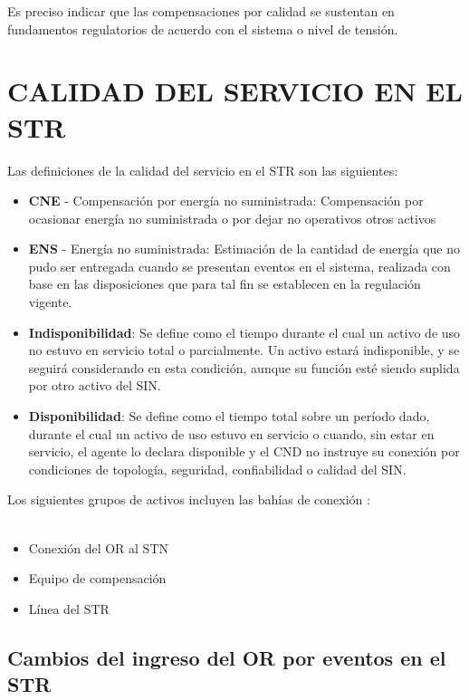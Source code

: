 \documentclass[a5paper]{book}%
\begin{document}
Es preciso indicar que las compensaciones por calidad se sustentan en fundamentos regulatorios
de acuerdo con el sistema o nivel de tensión.


\section{CALIDAD DEL SERVICIO EN EL STR}

Las definiciones de la calidad del servicio en el \ac{STR} son las siguientes:

\begin{itemize}
\item  \textbf{CNE} - Compensación por energía no suministrada: Compensación por ocasionar energía no suministrada o por dejar no operativos otros activos
\item \textbf{ENS} - Energía no suministrada: Estimación de la cantidad de energía que no pudo ser entregada cuando se presentan eventos en el sistema, realizada con base en las disposiciones que para tal fin se establecen en la regulación vigente.
\item \textbf{Indisponibilidad}: Se define como el tiempo durante el cual un activo de uso no estuvo en servicio total o parcialmente. Un activo estará indisponible, y se seguirá considerando en esta condición, aunque su función esté siendo suplida por otro activo del SIN.
\item \textbf{Disponibilidad}: Se define como el tiempo total sobre un período dado, durante el cual un activo de uso estuvo en servicio o cuando, sin estar en servicio, el agente lo declara disponible y el CND no instruye su conexión por condiciones de topología, seguridad, confiabilidad o calidad del SIN.
\end{itemize}


 Los siguientes  grupos de activos incluyen las bahías de conexión :\\\\
  \begin{itemize}
  \item Conexión del OR al STN
  \item Equipo de compensación
  \item Línea del \ac{STR}
  \end{itemize}

\subsection{Cambios del ingreso del OR por eventos en el STR}
\end{document}
